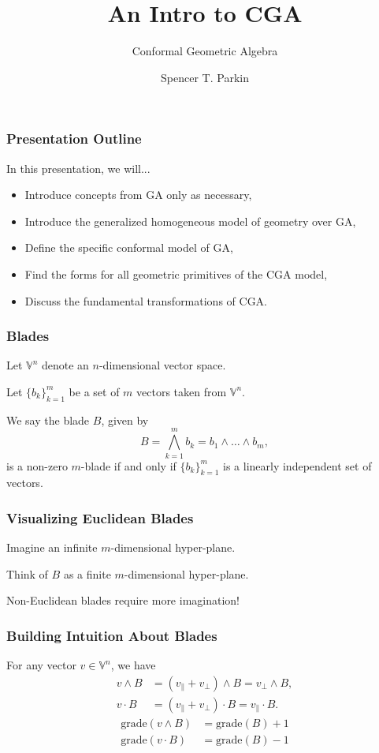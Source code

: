 \documentclass{beamer}
\title{An Intro to CGA}
\subtitle{Conformal Geometric Algebra}
\author{Spencer T. Parkin}
\institute{Avalanche Software}
\newcommand{\V}{\mathbb{V}}
\newcommand{\grade}{\mbox{grade}}
\begin{document}
\frame{\titlepage}

\begin{frame}
\frametitle{Presentation Outline}
In this presentation, we will...
\begin{itemize}
\item Introduce concepts from GA only as necessary,
\item Introduce the generalized homogeneous model of geometry over GA,
\item Define the specific conformal model of GA,
\item Find the forms for all geometric primitives of the CGA model,
\item Discuss the fundamental transformations of CGA.
\end{itemize}
\end{frame}

\begin{frame}
\frametitle{Blades}
Let $\V^n$ denote an $n$-dimensional vector space.

Let $\{b_k\}_{k=1}^m$ be a set of $m$ vectors taken from $\V^n$.
\begin{definition}
We say the blade $B$, given by
\begin{equation*}
B = \bigwedge_{k=1}^m b_k = b_1\wedge\dots\wedge b_m,
\end{equation*}
is a non-zero $m$-blade if and only if $\{b_k\}_{k=1}^m$
is a linearly independent set of vectors.
\end{definition}
\end{frame}

\begin{frame}
\frametitle{Visualizing Euclidean Blades}
Imagine an \alert{infinite} $m$-dimensional hyper-plane.

Think of $B$ as a \alert{finite} $m$-dimensional hyper-plane.

\alert{Non-Euclidean} blades require more imagination!
\end{frame}

\begin{frame}
\frametitle{Building Intuition About Blades}
For any vector $v\in\V^n$, we have
\begin{align*}
v\wedge B &= (v_{\parallel} + v_{\perp})\wedge B = v_{\perp}\wedge B, \\
v\cdot B &= (v_{\parallel} + v_{\perp})\cdot B = v_{\parallel}\cdot B.
\end{align*}
\begin{align*}
\grade(v\wedge B) &= \grade(B) + 1 \\
\grade(v\cdot B) &= \grade(B) - 1
\end{align*}
\end{frame}
\end{document}
